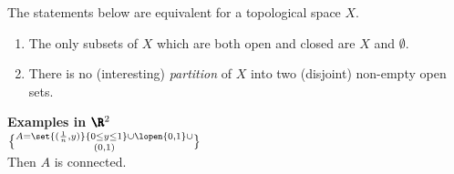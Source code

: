\prop The statements below are equivalent for a topological space $X$.
\begin{enumerate}[label=(\arabic*)]
\item The only subsets of $X$ which are both open and closed are $X$ and $\emptyset$.
\item There is no (interesting) \emph{partition} of $X$ into two (disjoint) non-empty open sets.
\end{enumerate}
\textbf{Examples in $\pmb\R^2$} \\
$A=\set{(\frac1n,y)}{0\leq y\leq1}\cup\lopen{0,1}\cup\brace{(0,1)}$ \\
Then $A$ is connected.
